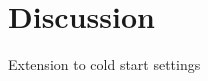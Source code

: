 \documentclass{sig-alternate-05-2015}
\begin{document}
%


\section{Discussion}
Extension to cold start settings
\end{document}
